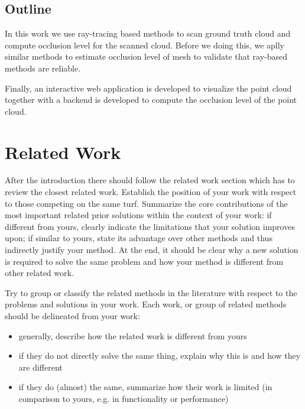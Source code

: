 \documentclass[11pt, a4paper,oneside,chapterprefix=false]{scrbook}
\begin{document}
\section{Outline} \label{sec:outline}

In this work we use ray-tracing based methods to scan ground truth cloud and compute occlusion level for the scanned cloud. Before we doing this, we aplly similar methods to estimate occlusion level of mesh to validate that ray-based methods are reliable.

Finally, an interactive web application is developed to visualize the point cloud together with a backend is developed to compute the occlusion level of the point cloud.

\chapter{Related Work} \label{chp:related}

After the introduction there should follow the related work section which has to review the closest related work. Establish the position of your work with respect to those competing on the same turf. Summarize the core contributions of the most important related prior solutions within the context of your work: if different from yours, clearly indicate the limitations that your solution improves upon; if similar to yours, state its advantage over other methods and thus indirectly justify your method. At the end, it should be clear why a new solution is required to solve the same problem and how your method is different from other related work.

Try to group or classify the related methods in the literature with respect to the problems and solutions in your work. Each work, or group of related methods should be delineated from your work:

\begin{itemize}
\item generally, describe how the related work is different from yours
\item if they do not directly solve the same thing, explain why this is and how they are different
\item if they do (almost) the same, summarize how their work is limited (in comparison to yours, e.g. in functionality or performance)
\end{itemize}
\end{document}
